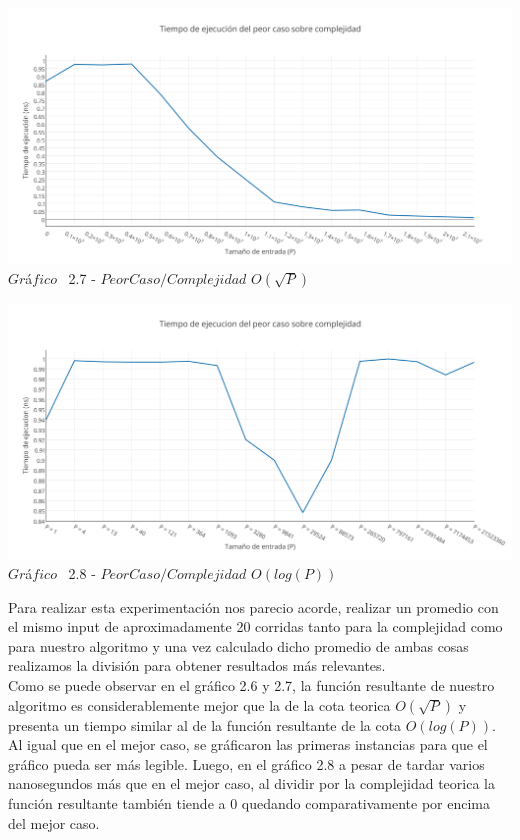\vspace*{0.3cm} \vspace*{0.3cm}
  \begin{center}
 \includegraphics[scale=0.65]{./EJ2/peorcaso2.png}
 {$Gr$\'a$fico$ \ 2.7 - $Peor Caso / Complejidad$ $O(\sqrt{P})$}
  \end{center}
  \vspace*{0.3cm}

\vspace*{0.3cm} \vspace*{0.3cm}
  \begin{center}
 \includegraphics[scale=0.65]{./EJ2/peorcaso3.png}
 {$Gr$\'a$fico$ \ 2.8 - $Peor Caso / Complejidad$ $O(log(P))$}
  \end{center}
  \vspace*{0.3cm}

Para realizar esta experimentaci\'on nos parecio acorde, realizar un promedio con el mismo input de aproximadamente 20 corridas
tanto para la complejidad como para nuestro algoritmo y una vez calculado dicho promedio de ambas cosas realizamos la divisi\'on para
obtener resultados m\'as relevantes.\\ 

Como se puede observar en el gr\'afico 2.6 y  2.7, la funci\'on resultante de nuestro algoritmo es considerablemente mejor que la de la cota teorica $O(\sqrt{P})$ y presenta un tiempo similar al de la funci\'on resultante de la cota $O(log(P))$. Al igual que en el mejor caso, se gr\'aficaron las primeras instancias para que el gr\'afico pueda ser m\'as legible.
Luego, en el gr\'afico 2.8 a pesar de tardar varios nanosegundos m\'as que en el mejor caso, al dividir por la complejidad teorica
la función resultante tambi\'en tiende a 0 quedando comparativamente por encima del mejor caso.\\

